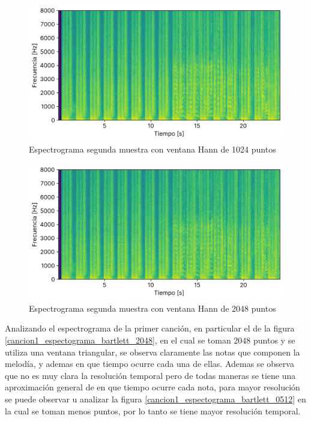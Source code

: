 \documentclass[12pt]{article}
\begin{document}
\begin{figure}[H]
\centering
\includegraphics{plot/cancion2_espectograma_hann_1024.png}
\caption{Espectrograma segunda muestra con ventana Hann de 1024 puntos}
\label{cancion2_espectograma_hann_1024}
\end{figure}

\begin{figure}[H]
\centering
\includegraphics{plot/cancion2_espectograma_hann_2048.png}
\caption{Espectrograma segunda muestra con ventana Hann de 2048 puntos}
\label{cancion2_espectograma_hann_2048}
\end{figure}

Analizando el espectrograma de la primer canción, en particular el de la figura \ref{cancion1_espectograma_bartlett_2048}, en el cual se toman 2048 puntos y se utiliza una ventana triangular, se observa claramente las notas que componen la melodía, y ademas en que tiempo ocurre cada una de ellas. Ademas se observa que no es muy clara la resolución temporal pero de todas maneras se tiene una aproximación general de en que tiempo ocurre cada nota, para mayor resolución se puede observar u analizar la figura \ref{cancion1_espectograma_bartlett_0512} en la cual se toman menos puntos, por lo tanto se tiene mayor resolución temporal.
\end{document}
